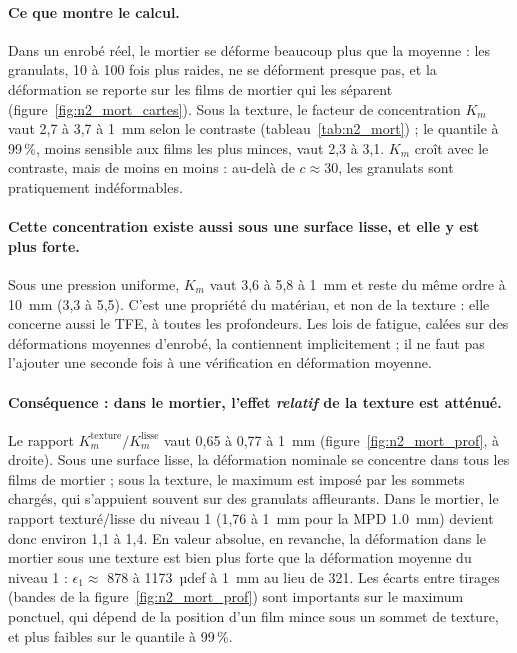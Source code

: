 \paragraph{Ce que montre le calcul.} Dans un enrobé réel, le mortier se déforme beaucoup plus
que la moyenne : les granulats, 10 à 100 fois plus raides, ne se déforment presque pas, et la
déformation se reporte sur les films de mortier qui les séparent
(figure~\ref{fig:n2_mort_cartes}). Sous la texture, le facteur de concentration $K_m$ vaut
2,7 à 3,7 à \SI{1}{mm} selon le contraste
(tableau~\ref{tab:n2_mort}) ; le quantile à 99\,\%, moins sensible aux films les plus minces, vaut
2,3 à 3,1. $K_m$ croît avec le contraste,
mais de moins en moins : au-delà de $c\approx30$, les granulats sont pratiquement indéformables.

\paragraph{Cette concentration existe aussi sous une surface lisse, et elle y est plus forte.} Sous
une pression uniforme, $K_m$ vaut 3,6 à 5,8 à \SI{1}{mm}
et reste du même ordre à \SI{10}{mm} (3,3 à 5,5).
C'est une propriété du matériau, et non de la texture : elle concerne aussi le TFE, à toutes les
profondeurs. Les lois de fatigue, calées sur des déformations moyennes d'enrobé, la contiennent
implicitement ; il ne faut pas l'ajouter une seconde fois à une vérification en déformation moyenne.

\paragraph{Conséquence : dans le mortier, l'effet \emph{relatif} de la texture est atténué.} Le rapport
$K_m^{\text{texture}}/K_m^{\text{lisse}}$ vaut 0,65 à 0,77 à \SI{1}{mm}
(figure~\ref{fig:n2_mort_prof}, à droite). Sous une surface lisse, la déformation nominale se
concentre dans tous les films de mortier ; sous la texture, le maximum est imposé par les
sommets chargés, qui s'appuient souvent sur des granulats affleurants. Dans le mortier, le rapport
texturé/lisse du niveau 1 (1,76 à \SI{1}{mm} pour la MPD \SI{1.0}{mm}) devient
donc environ 1,1 à 1,4. En valeur absolue, en
revanche, la déformation dans le mortier sous une texture est bien plus forte que la déformation
moyenne du niveau 1 : $\epsilon_1\approx$ 878 à 1173~µdef à
\SI{1}{mm} au lieu de 321. Les écarts entre tirages (bandes de la
figure~\ref{fig:n2_mort_prof}) sont importants sur le maximum ponctuel, qui dépend de la position d'un
film mince sous un sommet de texture, et plus faibles sur le quantile à 99\,\%.


